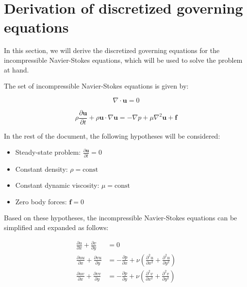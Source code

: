 \section{Derivation of discretized governing equations}
\label{sec:derivation_of_discretized_governing_equations}

In this section, we will derive the discretized governing equations for the incompressible Navier-Stokes equations, which will be used to solve the problem at hand.

The set of incompressible Navier-Stokes equations is given by:

\begin{equation*}
    \nabla \cdot {\mathbf{u}} = 0
    \label{eq:INS_continuity}
\end{equation*}

\begin{equation*}
    \rho \frac{\partial \mathbf{u}}{\partial t} + \rho \mathbf{u} \cdot \nabla \mathbf{u} = -\nabla p + \mu \nabla^2 \mathbf{u} + \mathbf{f}
    \label{eq:INS_momentum}
\end{equation*}

In the rest of the document, the following hypotheses will be considered:

\begin{itemize}
    \item Steady-state problem: $\frac{\partial \mathbf{u}}{\partial t} = 0$
    \item Constant density: $\rho = \text{const}$
    \item Constant dynamic viscosity: $\mu = \text{const}$
    \item Zero body forces: $\mathbf{f} = 0$
\end{itemize}

Based on these hypotheses, the incompressible Navier-Stokes equations can be simplified and expanded as follows:

\begin{align}
    \label{eq:INS_continuity_2D}
    \frac{\partial u}{\partial x} + \frac{\partial v}{\partial y}     & = 0                                                                                                                         \\
    \label{eq:INS_momentum_u_steady_2D}
    \frac{\partial u u}{\partial x} + \frac{\partial v u}{\partial y} & = -\frac{\partial p}{\partial x} + \nu \left( \frac{\partial^2 u}{\partial x^2} + \frac{\partial^2 u}{\partial y^2} \right) \\
    \label{eq:INS_momentum_y_steady_2D}
    \frac{\partial u v}{\partial x} + \frac{\partial v v}{\partial y} & = -\frac{\partial p}{\partial y} + \nu \left( \frac{\partial^2 v}{\partial x^2} + \frac{\partial^2 v}{\partial y^2} \right)
\end{align}

